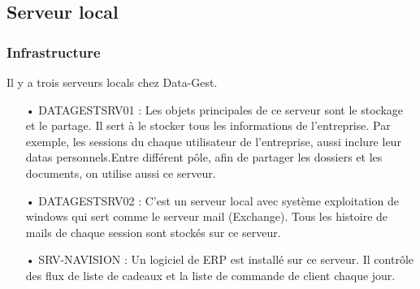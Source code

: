 \subsection{Serveur local}


\subsubsection{Infrastructure}
Il y a trois serveurs locals chez Data-Gest. 
\begin{itemize}
  \item[•]DATAGESTSRV01 : Les objets principales de ce serveur sont le stockage et le partage. Il sert à le stocker tous les informations de l'entreprise. Par exemple, les sessions du chaque utilisateur de l'entreprise, aussi inclure leur datas personnels.Entre différent pôle, afin de partager les dossiers et les documents, on utilise aussi ce serveur.
  \item[•]DATAGESTSRV02 : C'est un serveur local avec système exploitation de windows qui sert comme le serveur mail (Exchange). Tous les histoire de mails de chaque session sont stockés sur ce serveur.
  \item[•]SRV-NAVISION : Un logiciel de ERP est installé sur ce serveur. Il contrôle des flux de liste de cadeaux et la liste de commande de client chaque jour.  
\end{itemize}






%
%
%
%
%


